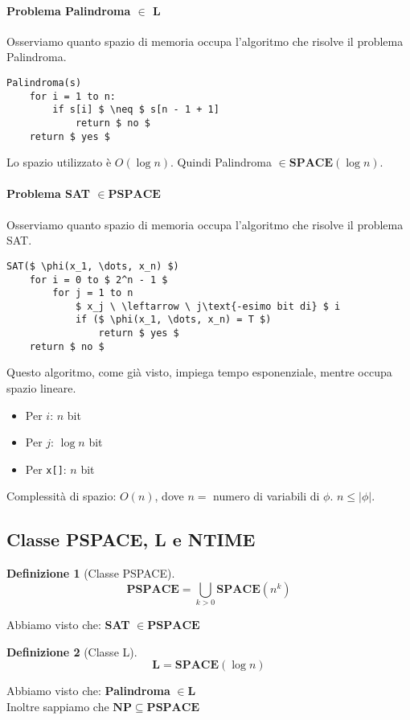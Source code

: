 \documentclass[a4paper]{article}
\theoremstyle{definition}
\newtheorem{definit}{Definizione}[subsection]
\newcommand{\np}{\mathbf{NP}}
\newcommand{\Space}{\mathbf{SPACE}}
\newcommand{\pspace}{\mathbf{PSPACE}}
\begin{document}
		\paragraph{Problema Palindroma $ \in $ L} Osserviamo quanto spazio di memoria occupa l'algoritmo che risolve il problema Palindroma.
		\begin{lstlisting}[mathescape = true, frame = tb]
Palindroma(s)
	for i = 1 to n:
		if s[i] $ \neq $ s[n - 1 + 1]
			return $ no $
	return $ yes $
		\end{lstlisting}
		Lo spazio utilizzato è $ O(\log n) $. Quindi Palindroma $ \in \Space(\log n) $.
		
		\paragraph{Problema SAT $ \in \pspace $} Osserviamo quanto spazio di memoria occupa l'algoritmo che risolve il problema SAT.
		\begin{lstlisting}[mathescape = true, frame = tb]
SAT($ \phi(x_1, \dots, x_n) $)
	for i = 0 to $ 2^n - 1 $
		for j = 1 to n
			$ x_j \ \leftarrow \ j\text{-esimo bit di} $ i
			if ($ \phi(x_1, \dots, x_n) = T $)
				return $ yes $
	return $ no $
		\end{lstlisting}
		Questo algoritmo, come già visto, impiega tempo esponenziale, mentre occupa spazio lineare.
		\begin{itemize}
			\item Per $ i $: $ n $ bit
			\item Per $ j $: $ \log n $ bit
			\item Per \lstinline|x[]|: $ n $ bit
 		\end{itemize}
		Complessità di spazio: $ O(n) $, dove $ n = $ numero di variabili di $ \phi $. $ n \leq |\phi| $.
		
		\subsection{Classe PSPACE, L e NTIME}
			\begin{definit}[Classe PSPACE]
				\[
					\pspace = \bigcup\limits_{k > 0} \Space(n^k)
				\]
			\end{definit}
			Abbiamo visto che: \textbf{SAT} $ \in \pspace $
			
			\begin{definit}[Classe L]
				\[
					\mathbf{L} = \Space(\log n)
				\]
			\end{definit}
			Abbiamo visto che: \textbf{Palindroma} $ \in \mathbf{L} $\\
			Inoltre sappiamo che $ \np \subseteq \pspace $
			
\end{document}
